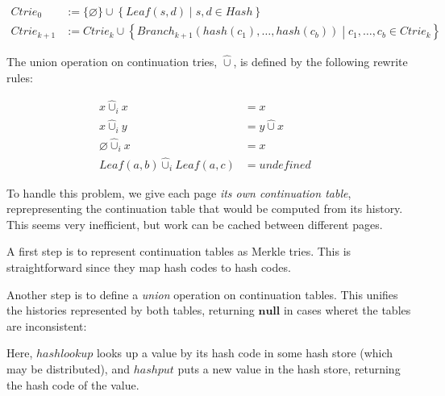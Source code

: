 \documentclass{article}
\begin{document}
\begin{align*}
  Ctrie_0 &:= \{ \varnothing \} \cup \left\{ Leaf(s, d) \middle| s, d \in Hash \right\} \\
  Ctrie_{k+1} &:= Ctrie_k \cup \left\{ Branch_{k+1}(hash(c_1), \ldots, hash(c_b)) \middle| c_1, \ldots, c_b \in Ctrie_k \right\}
\end{align*}

The union operation on continuation tries, $\hat{\cup}$, is defined by the following rewrite rules:

\begin{align*}
  x \hat{\cup}_i x &= x & \\
  x \hat{\cup}_i y &= y \hat{\cup} x & \\
  \varnothing \hat{\cup}_i x &= x & \\
  Leaf(a, b) \hat{\cup}_i Leaf(a, c) &= undefined &
\end{align*}

To handle this problem, we give each page \emph{its own continuation table}, reprepresenting the continuation table that would be computed from its history.  This seems very inefficient, but work can be cached between different pages.

A first step is to represent continuation tables as Merkle tries.  This is straightforward since they map hash codes to hash codes.

Another step is to define a \emph{union} operation on continuation tables.  This unifies the histories represented by both tables, returning $\mathbf{null}$ in cases wheret the tables are inconsistent:

\begin{algorithm}
\end{algorithm}

Here, $hashlookup$ looks up a value by its hash code in some hash store (which may be distributed), and $hashput$ puts a new value in the hash store, returning the hash code of the value.
\end{document}

